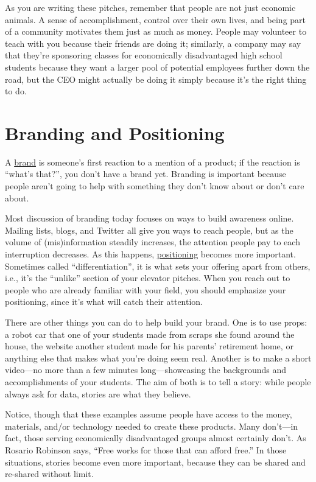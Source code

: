 As you are writing these pitches, remember that people are not just
economic animals. A sense of accomplishment, control over their own
lives, and being part of a community motivates them just as much as
money. People may volunteer to teach with you because their friends are
doing it; similarly, a company may say that they're sponsoring classes
for economically disadvantaged high school students because they want a
larger pool of potential employees further down the road, but the CEO
might actually be doing it simply because it's the right thing to do.

\section{Branding and Positioning}\label{s:marketing-branding}

A \protect\hyperlink{g:brand}{brand} is someone's first reaction to a mention
of a product; if the reaction is ``what's that?'', you don't have a brand
yet. Branding is important because people aren't going to help with
something they don't know about or don't care about.

Most discussion of branding today focuses on ways to build awareness
online. Mailing lists, blogs, and Twitter all give you ways to reach
people, but as the volume of (mis)information steadily increases, the
attention people pay to each interruption decreases. As this happens,
\protect\hyperlink{g:positioning}{positioning} becomes more important.
Sometimes called ``differentiation'', it is what sets your offering apart
from others, i.e., it's the ``unlike'' section of your elevator pitches.
When you reach out to people who are already familiar with your field,
you should emphasize your positioning, since it's what will catch their
attention.

There are other things you can do to help build your brand. One is to
use props: a robot car that one of your students made from scraps she
found around the house, the website another student made for his
parents' retirement home, or anything else that makes what you're
doing seem real. Another is to make a short video---no more than a few
minutes long---showcasing the backgrounds and accomplishments of your
students. The aim of both is to tell a story: while people always ask
for data, stories are what they believe.

Notice, though that these examples assume people have access to the
money, materials, and/or technology needed to create these products.
Many don't---in fact, those serving economically disadvantaged groups
almost certainly don't. As Rosario Robinson says, ``Free works for those
that can afford free.'' In those situations, stories become even more
important, because they can be shared and re-shared without limit.


